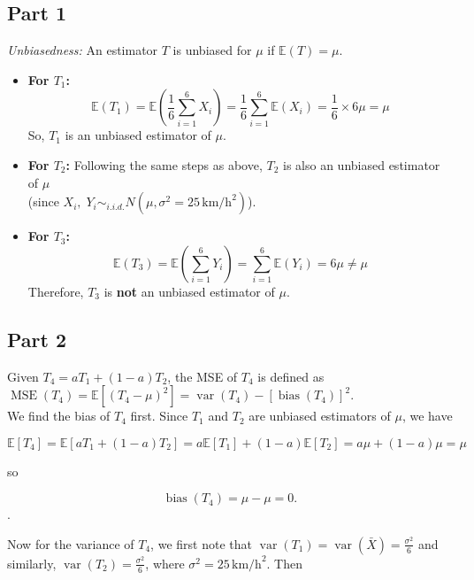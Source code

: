 \documentclass{article}
\begin{document}
\subsection*{Part 1}

\textit{Unbiasedness:} An estimator $T$ is unbiased for $\mu$ if $\mathbb{E}(T) = \mu$.

\begin{itemize}
    \item \textbf{For $T_1$:}
    $$
    \mathbb{E}(T_1) = \mathbb{E}\left(\frac{1}{6} \sum_{i=1}^{6} X_i\right) = \frac{1}{6} \sum_{i=1}^{6} \mathbb{E}(X_i) = \frac{1}{6} \times 6\mu = \mu
    $$
    So, $T_1$ is an unbiased estimator of $\mu$.

    \item \textbf{For $T_2$:}
    Following the same steps as above, $T_2$ is also an unbiased estimator of \( \mu \) \\
    (since $X_i, \; Y_i \sim_{i.i.d.} N(\mu, \sigma^2 = 25 \, \text{km/h}^2)$).

    \item \textbf{For $T_3$:}
    $$
    \mathbb{E}(T_3) = \mathbb{E}\left(\sum_{i=1}^{6} Y_i\right) = \sum_{i=1}^{6} \mathbb{E}(Y_i) = 6\mu \neq \mu
    $$
    Therefore, $T_3$ is \textbf{not} an unbiased estimator of $\mu$.
\end{itemize}

\subsection*{Part 2}

Given $T_4 = aT_1 + (1 - a)T_2$, the MSE of $T_4$ is defined as $ \operatorname{MSE}(T_4) = \mathbb{E}[(T_4 - \mu)^2] = \operatorname{var}(T_4) - [\operatorname{bias}(T_4)]^2$. \\

We find the bias of $T_4$ first. Since $T_1$ and $T_2$ are unbiased estimators of $\mu$, we have

$$
\mathbb{E}[T_4] = \mathbb{E}[aT_1 + (1-a)T_2] = a\mathbb{E}[T_1] + (1-a)\mathbb{E}[T_2] = a\mu + (1-a)\mu = \mu
$$

so

$$
\operatorname{bias}(T_4) = \mu - \mu = 0.
$$. 

Now for the variance of $T_4$, we first note that $\operatorname{var}(T_1) = \operatorname{var}(\bar{X}) = \frac{\sigma^2}{6}$ and similarly,  $\operatorname{var}(T_2) = \frac{\sigma^2}{6}$, where $\sigma^2 = 25 \, \text{km/h}^2$. Then
\end{document}
